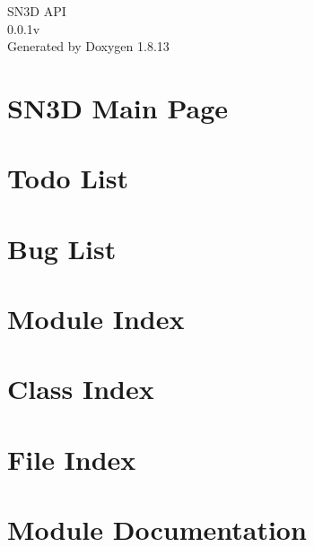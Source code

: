 \documentclass[twoside]{book}
\newcommand{\+}{\discretionary{\mbox{\scriptsize$\hookleftarrow$}}{}{}}
\newcommand{\clearemptydoublepage}{%
  \newpage{\pagestyle{empty}\cleardoublepage}%
}
\begin{document}
\hypersetup{pageanchor=false,
             bookmarksnumbered=true,
             pdfencoding=unicode
            }
\begin{titlepage}
\vspace*{7cm}
\begin{center}%
{\Large S\+N3D A\+PI \\[1ex]\large 0.\+0.\+1v }\\
\vspace*{1cm}
{\large Generated by Doxygen 1.8.13}\\
\end{center}
\end{titlepage}
\clearemptydoublepage
{}
\tableofcontents
\clearemptydoublepage
{}
\hypersetup{pageanchor=true}

\chapter{S\+N3D Main Page}
\label{index}\hypertarget{index}{}
\chapter{Todo List}
\label{todo}

\chapter{Bug List}
\label{bug}

\chapter{Module Index}

\chapter{Class Index}

\chapter{File Index}

\chapter{Module Documentation}













\end{document}
